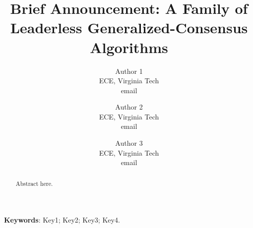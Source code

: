 \begin{titlepage}


\title{Brief Announcement: A Family of Leaderless Generalized-Consensus Algorithms}

\author{
Author 1\\
ECE, Virginia Tech\\
email
\and
Author 2\\
ECE, Virginia Tech\\
email
\and
Author 3\\
ECE, Virginia Tech\\
email
}


\date{}

\maketitle \thispagestyle{empty}


\begin{abstract}
Abstract here.
\end{abstract}

\bigskip

\centerline{{\bf Keywords}: Key1; Key2; Key3; Key4.}

\end{titlepage}

\newpage